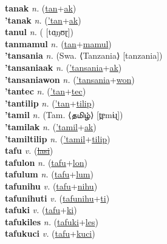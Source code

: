 \textbf{tanak} \textit{n.} (\hyperref[tan]{tan}+\hyperref[ak]{ak})
 \label{tanak} \\
\textbf{'tanak} \textit{n.} (\hyperref['tan]{'tan}+\hyperref[ak]{ak})
 \label{'tanak} \\
\textbf{tanul} \textit{n.} ( [tɑ̤ŋʊɽ])
 \label{tanul} \\
\textbf{tanmamul} \textit{n.} (\hyperref[tan]{tan}+\hyperref[mamul]{mamul})
 \label{tanmamul} \\
\textbf{'tansania} \textit{n.} (Swa. ⟨Tanzania⟩ [tanzania])
 \label{'tansania} \\
\textbf{'tansaniaak} \textit{n.} (\hyperref['tansania]{'tansania}+\hyperref[ak]{ak})
 \label{'tansaniaak} \\
\textbf{'tansaniawon} \textit{n.} (\hyperref['tansania]{'tansania}+\hyperref[won]{won})
 \label{'tansaniawon} \\
\textbf{'tantec} \textit{n.} (\hyperref['tan]{'tan}+\hyperref[tec]{tec})
 \label{'tantec} \\
\textbf{'tantilip} \textit{n.} (\hyperref['tan]{'tan}+\hyperref[tilip]{tilip})
 \label{'tantilip} \\
\textbf{'tamil} \textit{n.} (Tam. ⟨தமிழ்⟩ [t̪ɐmɨɻ])
 \label{'tamil} \\
\textbf{'tamilak} \textit{n.} (\hyperref['tamil]{'tamil}+\hyperref[ak]{ak})
 \label{'tamilak} \\
\textbf{'tamiltilip} \textit{n.} (\hyperref['tamil]{'tamil}+\hyperref[tilip]{tilip})
 \label{'tamiltilip} \\
\textbf{tafu} \textit{v.} (\hyperref[lasi]{\sout{lasi}})
 \label{tafu} \\
\textbf{tafulon} \textit{n.} (\hyperref[tafu]{tafu}+\hyperref[lon]{lon})
 \label{tafulon} \\
\textbf{tafulum} \textit{n.} (\hyperref[tafu]{tafu}+\hyperref[lum]{lum})
 \label{tafulum} \\
\textbf{tafunihu} \textit{v.} (\hyperref[tafu]{tafu}+\hyperref[nihu]{nihu})
 \label{tafunihu} \\
\textbf{tafunihuti} \textit{v.} (\hyperref[tafunihu]{tafunihu}+\hyperref[ti]{ti})
 \label{tafunihuti} \\
\textbf{tafuki} \textit{v.} (\hyperref[tafu]{tafu}+\hyperref[ki]{ki})
 \label{tafuki} \\
\textbf{tafukiles} \textit{n.} (\hyperref[tafuki]{tafuki}+\hyperref[les]{les})
 \label{tafukiles} \\
\textbf{tafukuci} \textit{v.} (\hyperref[tafu]{tafu}+\hyperref[kuci]{kuci})
